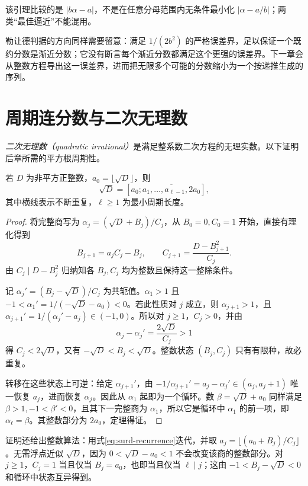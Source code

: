 该引理比较的是 $|b\alpha-a|$，不是在任意分母范围内无条件最小化 $|\alpha-a/b|$；两类“最佳逼近”不能混用。

勒让德判据的方向同样需要留意：满足 $1/(2b^2)$ 的严格误差界，足以保证一个既约分数是渐近分数；它没有断言每个渐近分数都满足这个更强的误差界。下一章会从整数方程导出这一误差界，进而把无限多个可能的分数缩小为一个按递推生成的序列。

\section{周期连分数与二次无理数}

\emph{二次无理数（quadratic irrational）}是满足整系数二次方程的无理实数。以下证明后章所需的平方根周期性。

\begin{theorem}[平方根的周期展开]
\label{thm:sqrt-period}
若 $D$ 为非平方正整数，$a_0=\lfloor\sqrt D\rfloor$，则
\[
 \sqrt D=[a_0;\overline{a_1,\ldots,a_{\ell-1},2a_0}],
\]
其中横线表示不断重复，$\ell\ge1$ 为最小周期长度。
\end{theorem}
\begin{proof}
将完整商写为 $\alpha_j=(\sqrt D+B_j)/C_j$，从 $B_0=0,C_0=1$ 开始，直接有理化得到
\begin{equation}
 B_{j+1}=a_jC_j-B_j,\qquad
 C_{j+1}=\frac{D-B_{j+1}^2}{C_j}.
 \label{eq:surd-recurrence}
\end{equation}
由 $C_j\mid D-B_j^2$ 归纳知各 $B_j,C_j$ 均为整数且保持这一整除条件。

记 $\alpha_j'=(B_j-\sqrt D)/C_j$ 为共轭值。$\alpha_1>1$ 且 $-1<\alpha_1'=1/(-\sqrt D-a_0)<0$。若此性质对 $j$ 成立，则 $\alpha_{j+1}>1$，且 $\alpha_{j+1}'=1/(\alpha_j'-a_j)\in(-1,0)$。所以对 $j\ge1$，$C_j>0$，并由
\[
 \alpha_j-\alpha_j'=\frac{2\sqrt D}{C_j}>1
\]
得 $C_j<2\sqrt D$，又有 $-\sqrt D<B_j<\sqrt D$。整数状态 $(B_j,C_j)$ 只有有限种，故必重复。

转移在这些状态上可逆：给定 $\alpha_{j+1}'$，由 $-1/\alpha_{j+1}'=a_j-\alpha_j'\in(a_j,a_j+1)$ 唯一恢复 $a_j$，进而恢复 $\alpha_j$。因此从 $\alpha_1$ 起即为一个循环。数 $\beta=\sqrt D+a_0$ 同样满足 $\beta>1,-1<\beta'<0$，且其下一完整商为 $\alpha_1$，所以它是循环中 $\alpha_1$ 的前一项，即 $\alpha_\ell=\beta$。其整数部分为 $2a_0$，定理得证。
\end{proof}

证明还给出整数算法：用式\eqref{eq:surd-recurrence}迭代，并取 $a_j=\lfloor(a_0+B_j)/C_j\rfloor$。无需浮点近似 $\sqrt D$，因为 $0<\sqrt D-a_0<1$ 不会改变该商的整数部分。对 $j\ge1$，$C_j=1$ 当且仅当 $B_j=a_0$，也即当且仅当 $\ell\mid j$；这由 $-1<B_j-\sqrt D<0$ 和循环中状态互异得到。

